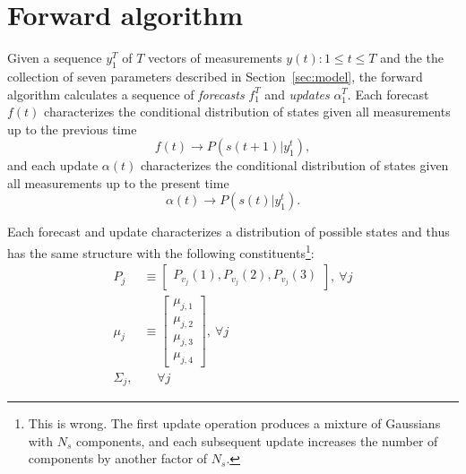 \documentclass[12pt]{article}
\begin{document}
\section{Forward algorithm}
\label{sec:forward}

Given a sequence $y_1^T$ of $T$ vectors of measurements $y(t):1 \leq t
\leq T$ and the the collection of  seven parameters described in
Section~\ref{sec:model}, the forward algorithm calculates a sequence
of \emph{forecasts} $f_1^T$ and \emph{updates} $\alpha_1^T$.  Each
forecast $f(t)$ characterizes the conditional distribution of states
given all measurements up to the previous time
\begin{equation*}
  f(t) \rightarrow P(s(t+1)|y_1^t),
\end{equation*}
and each update $\alpha(t)$ characterizes the conditional distribution
of states given all measurements up to the present time
\begin{equation*}
  \alpha(t) \rightarrow P(s(t)|y_1^t).
\end{equation*}

Each forecast and update characterizes a distribution of possible
states and thus has the same structure with the following
constituents\footnote{This is wrong.  The first update operation
  produces a mixture of Gaussians with $N_s$ components, and each
  subsequent update increases the number of components by another
  factor of $N_s$.}:
\begin{subequations}
  \label{eq:psForm}
  \begin{align}
    P_j &\equiv \begin{bmatrix} P_{v_j}(1), P_{v_j}(2), P_{v_j}(3)
    \end{bmatrix}, ~\forall j\\
    \mu_j &\equiv \begin{bmatrix} \mu_{j,1} \\ \mu_{j,2} \\ \mu_{j,3} \\
      \mu_{j,4} \end{bmatrix}, ~\forall j\\
    \Sigma_j, &~~~~~\forall j
  \end{align}
\end{subequations}
\end{document}
